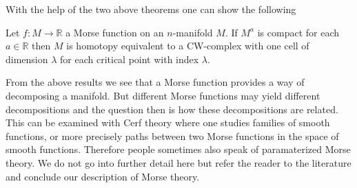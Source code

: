 With the help of the two above theorems one can show the following
\\
\begin{thm}
\label{thm:mancw}
Let $f \colon M \to \mathbb{R}$ a Morse function on an $n$-manifold $M$. If $M^{a}$ is compact for each $a \in \mathbb{R}$ then $M$ is homotopy equivalent to a CW-complex with one cell of dimension $\lambda$ for each critical point with index $\lambda$.
\end{thm}
From the above results we see that a Morse function provides a way of decomposing a manifold. But different Morse functions may yield different decompositions and the question then is how these decompositions are related. This can be examined with Cerf theory where one studies families of smooth functions, or more precisely paths between two Morse functions in the space of smooth functions. Therefore people sometimes also speak of paramaterized Morse theory. We do not go into further detail here but refer the reader to the literature and conclude our description of Morse theory.
